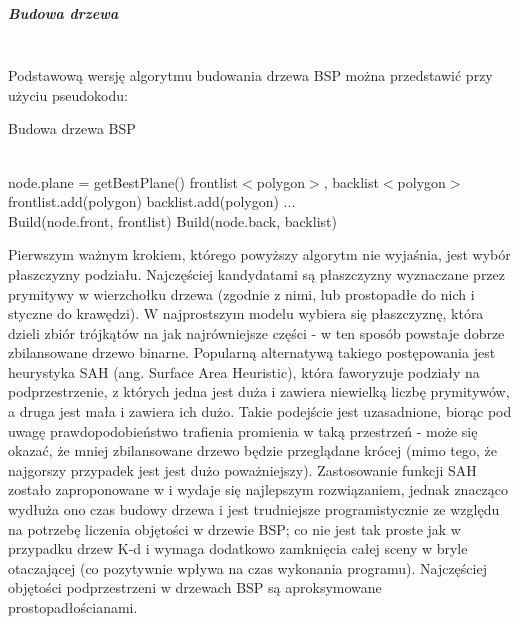 \subparagraph{Budowa drzewa}\mbox{} \\

Podstawową wersję algorytmu budowania drzewa BSP można przedstawić przy użyciu pseudokodu:

\begin{algorithm}
\begin{algorithmic}
\caption{Budowa drzewa BSP}
\\
\State node.plane = getBestPlane()
\State frontlist$<$polygon$>$, backlist$<$polygon$>$
\\
    		frontlist.add(polygon)
     		backlist.add(polygon)
     \Else
     		...
     \EndIf
\EndFor
\\
\State Build(node.front, frontlist)
\State Build(node.back, backlist)
\\
\EndFunction
\end{algorithmic}
\end{algorithm}


Pierwszym ważnym krokiem, którego powyższy algorytm nie wyjaśnia, jest wybór płaszczyzny podziału. Najczęściej kandydatami są płaszczyzny wyznaczane przez prymitywy w wierzchołku drzewa (zgodnie z nimi, lub prostopadłe do nich i styczne do krawędzi). W najprostszym modelu wybiera się płaszczyznę, która dzieli zbiór trójkątów na jak najrówniejsze części - w ten sposób powstaje dobrze zbilansowane drzewo binarne. Popularną alternatywą takiego postępowania jest heurystyka SAH \cite{zuk2008, sah1, sah2} (ang. Surface Area Heuristic), która faworyzuje podziały na podprzestrzenie, z których jedna jest duża i zawiera niewielką liczbę prymitywów, a druga jest mała i zawiera ich dużo. Takie podejście jest uzasadnione, biorąc pod uwagę prawdopodobieństwo trafienia promienia w taką przestrzeń - może się okazać, że mniej zbilansowane drzewo będzie przeglądane krócej (mimo tego, że najgorszy przypadek jest jest dużo poważniejszy). Zastosowanie funkcji SAH zostało zaproponowane w \cite{sah1} i wydaje się najlepszym rozwiązaniem, jednak znacząco wydłuża ono czas budowy drzewa i jest trudniejsze programistycznie ze względu na potrzebę liczenia objętości w drzewie BSP; co nie jest tak proste jak w przypadku drzew K-d i wymaga dodatkowo zamknięcia całej sceny w bryle otaczającej (co pozytywnie wpływa na czas wykonania programu). Najczęściej objętości podprzestrzeni w drzewach BSP są aproksymowane prostopadłościanami.

